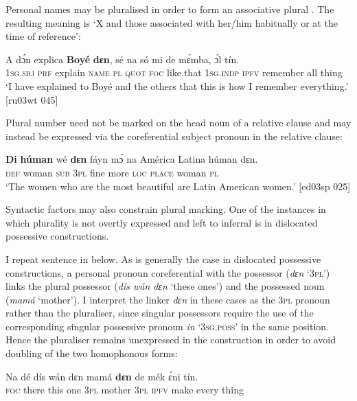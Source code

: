 Personal names may be pluralised in order to form an associative plural . The resulting meaning is ‘X and those associated with her/him habitually or at the time of reference’:


\ea%
    \label{ex:key:218}
    \gll \MakeUppercase{A}   dɔ́n    explica  \textbf{Boyé}  \textbf{dɛn},    sé    na  só
mi    de  mɛ́mba,    ɔ́l  tín.\\
\textsc{1sg.sbj}  \textsc{prf}    explain  \textsc{name}  \textsc{pl}    \textsc{quot}  \textsc{foc}  like.that  
\textsc{1sg.indp}  \textsc{ipfv}  remember  all  thing\\

\glt ‘I have explained to Boyé and the others that this is how I remember everything.’ [ru03wt 045]
\z

Plural number need not be marked on the head noun of a relative clause and may instead be expressed via the coreferential subject pronoun in the relative clause:


\ea%
    \label{ex:key:219}
    \gll \textbf{Di}  \textbf{húman}  wé  \textbf{dɛn}  fáyn    mɔ́    na  {América Latina}
húman  dɛn.\\
\textsc{def}  woman  \textsc{sub}  \textsc{3pl}  fine    more  \textsc{loc}  \textsc{place}
woman  \textsc{pl}\\

\glt ‘The women who are the most beautiful are Latin American women.’ [ed03sp 025]
\z

Syntactic factors may also constrain plural marking. One of the instances in which plurality is not overtly expressed and left to inferral is in dislocated possessive constructions.


I repeat sentence  in  below. As is generally the case in dislocated possessive constructions, a personal pronoun coreferential with the possessor (\textit{dɛn} ‘\textsc{3pl}’) links the plural possessor (\textit{dís wán dɛn} ‘these ones’) and the possessed noun (\textit{mamá} ‘mother’). I interpret the linker \textit{dɛn} in these cases as the \textsc{3pl} pronoun rather than the pluraliser, since singular possessors require the use of the corresponding singular possessive pronoun \textit{in} ‘\textsc{3sg.poss}’ in the same position. Hence the pluraliser remains unexpressed in the construction in order to avoid doubling of the two homophonous forms:



\ea%
    \label{ex:key:220}
    \gll Na  dé    dís  wán    dɛn    mamá  \textbf{dɛn}  de  mék    ɛ́ni    tín.\\
\textsc{foc}  there  this  one    \textsc{3pl}    mother  \textsc{3pl}  \textsc{ipfv}  make  every  thing\\


